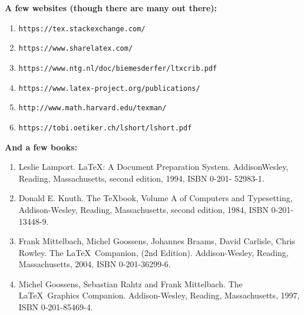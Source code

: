 \documentclass[11pt]{article}
\begin{document}
\vspace{1 cm}

\flushleft \textbf{A few websites (though there are many out there):}
\begin{enumerate}
	\item \texttt{https://tex.stackexchange.com/}
	\item \texttt{https://www.sharelatex.com/}
	\item \texttt{https://www.ntg.nl/doc/biemesderfer/ltxcrib.pdf}
	\item \texttt{https://www.latex-project.org/publications/}
	\item \texttt{http://www.math.harvard.edu/texman/}
	\item \texttt{https://tobi.oetiker.ch/lshort/lshort.pdf}
\end{enumerate}

\flushleft \textbf{And a few books:}
\begin{enumerate}
	\item Leslie Lamport. \LaTeX: A Document Preparation System. AddisonWesley,
	Reading, Massachusetts, second edition, 1994, ISBN 0-201-
	52983-1.
	
	\item Donald E. Knuth. The \TeX book, Volume A of Computers and Typesetting,
	Addison-Wesley, Reading, Massachusetts, second edition, 1984,
	ISBN 0-201-13448-9.
	
	\item Frank Mittelbach, Michel Goossens, Johannes Braams, David Carlisle,
	Chris Rowley. The \LaTeX\ Companion, (2nd Edition). Addison-Wesley,
	Reading, Massachusetts, 2004, ISBN 0-201-36299-6.
	
	\item Michel Goossens, Sebastian Rahtz and Frank Mittelbach. The \LaTeX\
	Graphics Companion. Addison-Wesley, Reading, Massachusetts, 1997,
	ISBN 0-201-85469-4.
\end{enumerate}
\end{document}
